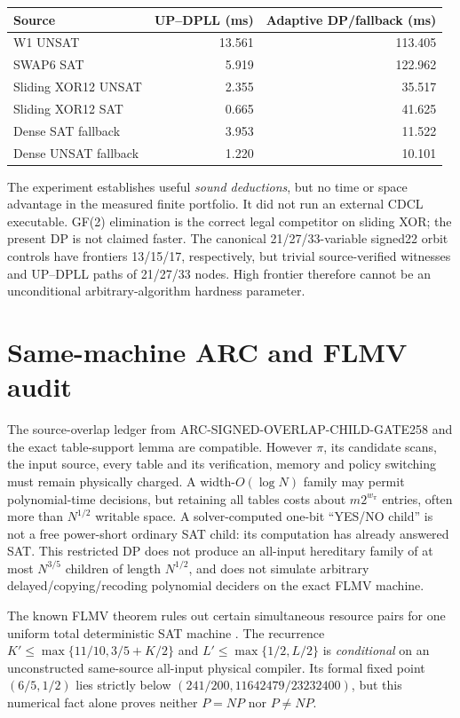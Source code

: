 \documentclass[10pt]{article}
\begin{document}
\begin{center}\small
\begin{tabular}{lrr}
\toprule Source & UP--DPLL (ms)& Adaptive DP/fallback (ms)\\\midrule
W1 UNSAT &13.561&113.405\\
SWAP6 SAT &5.919&122.962\\
Sliding XOR12 UNSAT &2.355&35.517\\
Sliding XOR12 SAT &0.665&41.625\\
Dense SAT fallback &3.953&11.522\\
Dense UNSAT fallback &1.220&10.101\\\bottomrule
\end{tabular}
\end{center}
The experiment establishes useful \emph{sound deductions}, but no time or space advantage in the measured finite portfolio. It did not run an external CDCL executable. GF(2) elimination is the correct legal competitor on sliding XOR; the present DP is not claimed faster. The canonical 21/27/33-variable signed22 orbit controls have frontiers 13/15/17, respectively, but trivial source-verified witnesses and UP--DPLL paths of 21/27/33 nodes. High frontier therefore cannot be an unconditional arbitrary-algorithm hardness parameter.

\section{Same-machine ARC and FLMV audit}
The source-overlap ledger from ARC-SIGNED-OVERLAP-CHILD-GATE258 and the exact table-support lemma are compatible. However $\pi$, its candidate scans, the input source, every table and its verification, memory and policy switching must remain physically charged. A width-$O(\log N)$ family may permit polynomial-time decisions, but retaining all tables costs about $m2^{w_\pi}$ entries, often more than $N^{1/2}$ writable space. A solver-computed one-bit ``YES/NO child'' is not a free power-short ordinary SAT child: its computation has already answered SAT. This restricted DP does not produce an all-input hereditary family of at most $N^{3/5}$ children of length $N^{1/2}$, and does not simulate arbitrary delayed/copying/recoding polynomial deciders on the exact FLMV machine.

The known FLMV theorem rules out certain simultaneous resource pairs for one uniform total deterministic SAT machine \cite{flmv}. The recurrence $K'\le\max\{11/10,3/5+K/2\}$ and $L'\le\max\{1/2,L/2\}$ is \emph{conditional} on an unconstructed same-source all-input physical compiler. Its formal fixed point $(6/5,1/2)$ lies strictly below $(241/200,11642479/23232400)$, but this numerical fact alone proves neither $P=NP$ nor $P\ne NP$.
\end{document}
